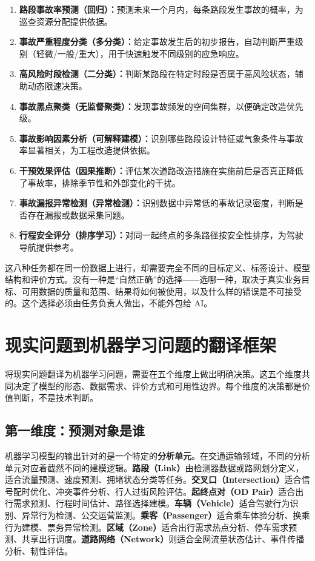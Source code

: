 \begin{enumerate}
  \item \textbf{路段事故率预测（回归）：}预测未来一个月内，每条路段发生事故的概率，为巡查资源分配提供依据。
  \item \textbf{事故严重程度分类（多分类）：}给定事故发生后的初步报告，自动判断严重级别（轻微/一般/重大），用于快速触发不同级别的应急响应。
  \item \textbf{高风险时段检测（二分类）：}判断某路段在特定时段是否属于高风险状态，辅助动态限速决策。
  \item \textbf{事故黑点聚类（无监督聚类）：}发现事故频发的空间集群，以便确定改造优先级。
  \item \textbf{事故影响因素分析（可解释建模）：}识别哪些路段设计特征或气象条件与事故率显著相关，为工程改造提供依据。
  \item \textbf{干预效果评估（因果推断）：}评估某次道路改造措施在实施前后是否真正降低了事故率，排除季节性和外部变化的干扰。
  \item \textbf{事故漏报异常检测（异常检测）：}识别数据中异常低的事故记录密度，判断是否存在漏报或数据采集问题。
  \item \textbf{行程安全评分（排序学习）：}对同一起终点的多条路径按安全性排序，为驾驶导航提供参考。
\end{enumerate}

这八种任务都在同一份数据上进行，却需要完全不同的目标定义、标签设计、模型结构和评价方式。没有一种是“自然正确”的选择——选哪一种，取决于真实业务目标、可用数据的质量和范围、结果将如何被使用，以及什么样的错误是不可接受的。这个选择必须由任务负责人做出，不能外包给 AI。

\section{现实问题到机器学习问题的翻译框架}

将现实问题翻译为机器学习问题，需要在五个维度上做出明确决策。这五个维度共同决定了模型的形态、数据需求、评价方式和可用性边界。每个维度的决策都是价值判断，不是技术判断。

\subsection{第一维度：预测对象是谁}

机器学习模型的输出针对的是一个特定的\textbf{分析单元}。在交通运输领域，不同的分析单元对应着截然不同的建模逻辑。\textbf{路段（Link）}由检测器数据或路网划分定义，适合流量预测、速度预测、拥堵状态分类等任务。\textbf{交叉口（Intersection）}适合信号配时优化、冲突事件分析、行人过街风险评估。\textbf{起终点对（OD Pair）}适合出行需求预测、行程时间估计、路径选择建模。\textbf{车辆（Vehicle）}适合驾驶行为识别、异常行为检测、公交运营监测。\textbf{乘客（Passenger）}适合乘车体验分析、换乘行为建模、票务异常检测。\textbf{区域（Zone）}适合出行需求热点分析、停车需求预测、共享出行调度。\textbf{道路网络（Network）}则适合全网流量状态估计、事件传播分析、韧性评估。

